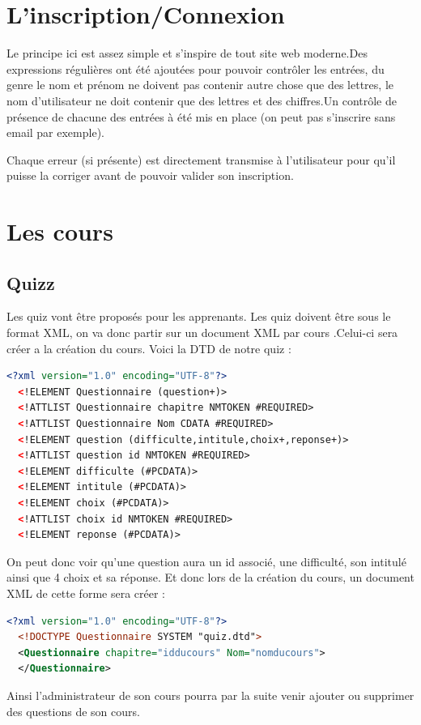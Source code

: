 \documentclass[a4paper,10pt]{article}
\begin{document}
\newpage
\section{L'inscription/Connexion}
Le principe ici est assez simple et s'inspire de tout site web moderne.Des expressions régulières ont été ajoutées pour pouvoir contrôler les entrées, du genre le nom et prénom ne doivent pas contenir autre chose que des lettres, le nom d'utilisateur ne doit contenir que des lettres et des chiffres.Un contrôle de présence de chacune des entrées à été mis en place (on peut pas s'inscrire sans email par exemple).

Chaque erreur (si présente) est directement transmise à l'utilisateur pour qu'il puisse la corriger avant de pouvoir valider son inscription.

\section{Les cours}
\subsection{Quizz}
Les quiz vont être proposés pour les apprenants. Les quiz doivent être sous le format XML, on va donc partir sur un document XML par cours .Celui-ci sera créer a la création du cours.
Voici la DTD de notre quiz : 
\begin{lstlisting}[language=XML]
  <?xml version="1.0" encoding="UTF-8"?>
  <!ELEMENT Questionnaire (question+)>
  <!ATTLIST Questionnaire chapitre NMTOKEN #REQUIRED>
  <!ATTLIST Questionnaire Nom CDATA #REQUIRED>
  <!ELEMENT question (difficulte,intitule,choix+,reponse+)>
  <!ATTLIST question id NMTOKEN #REQUIRED>
  <!ELEMENT difficulte (#PCDATA)>
  <!ELEMENT intitule (#PCDATA)>
  <!ELEMENT choix (#PCDATA)>
  <!ATTLIST choix id NMTOKEN #REQUIRED>
  <!ELEMENT reponse (#PCDATA)>
\end{lstlisting}
On peut donc voir qu'une question aura un id associé, une difficulté, son intitulé ainsi que 4 choix et sa réponse.
Et donc lors de la création du cours, un document XML de cette forme sera créer : 
\begin{lstlisting}[language=XML]
  <?xml version="1.0" encoding="UTF-8"?>
  <!DOCTYPE Questionnaire SYSTEM "quiz.dtd">
  <Questionnaire chapitre="idducours" Nom="nomducours"> 
  </Questionnaire>
\end{lstlisting} 

Ainsi l'administrateur de son cours pourra par la suite venir ajouter ou supprimer des questions de son cours. 
\end{document}
